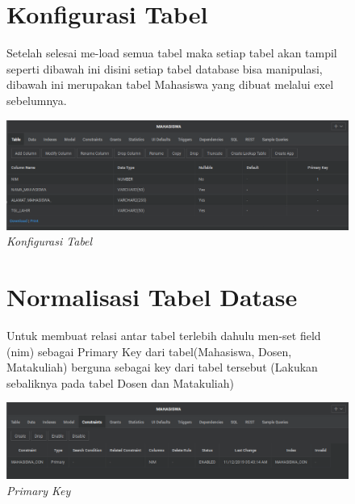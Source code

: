 \begin{enumerate}
\begin{figure}
\section{Konfigurasi Tabel}
Setelah selesai me-load semua tabel maka setiap tabel akan tampil seperti
dibawah ini disini setiap tabel database bisa manipulasi, dibawah ini merupakan tabel Mahasiswa
yang dibuat melalui exel sebelumnya.
    \begin{center}
\includegraphics[scale=0.4]{figures/mhsTabel.png}
    \caption{\textit{Konfigurasi Tabel}}
        \end{center}
\label{gambar}
\end{figure}

\begin{figure}

\section{Normalisasi Tabel Datase}
Untuk membuat relasi antar tabel terlebih dahulu men-set field (nim) sebagai
 Primary Key dari tabel(Mahasiswa, Dosen, Matakuliah)
berguna sebagai key dari tabel tersebut (Lakukan sebaliknya pada tabel Dosen
dan Matakuliah)

    \begin{center}
\includegraphics[scale=0.4]{figures/primaryKey.png}
    \caption{\textit{Primary Key}}
        \end{center}
\label{gambar}
\end{figure}

\begin{figure}

\end{figure}
\end{enumerate}
